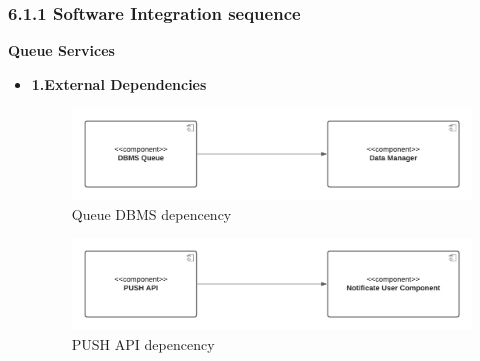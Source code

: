 \subsubsection{6.1.1 Software Integration sequence}
\label{subsect: softwareintegrationsequence}
\textbf{Queue Services}
\begin{itemize}
    \item \textbf{1.External Dependencies}
    \begin{figure}[h!]
        \centering
        \includegraphics[width=1\textwidth]{Images/Test Diagram/Queue/ExternalDepDBMS.png}
        \caption{\label{fig:QueueExternalDepDBMS}{Queue DBMS depencency}}
    \end{figure}  
    
    \begin{figure}[h!]
        \centering
        \includegraphics[width=1\textwidth]{Images/Test Diagram/Queue/ExternalDepPUSH.png}
        \caption{\label{fig:QueueExternalDepPUSH}{PUSH API depencency}}
    \end{figure}  
    

\end{itemize}
